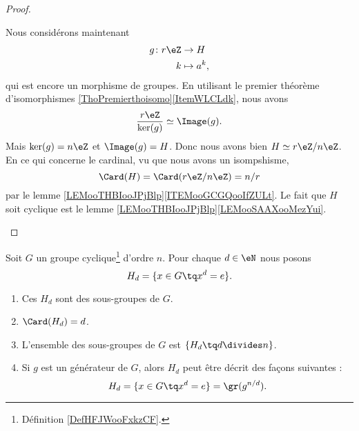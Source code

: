 \begin{proof}
\begin{subproof}
		Nous considérons maintenant
		\begin{equation}
			\begin{aligned}
				g\colon r\eZ & \to H        \\
				k            & \mapsto a^k,
			\end{aligned}
		\end{equation}
		qui est encore un morphisme de groupes. En utilisant le premier théorème d'isomorphismes \ref{ThoPremierthoisomo}\ref{ItemWLCLdk}, nous avons
		\begin{equation}
			\frac{ r\eZ }{ \ker(g) }\simeq\Image(g).
		\end{equation}
		Mais \( \ker(g)=n\eZ\) et \( \Image(g)=H\). Donc nous avons bien \( H\simeq r\eZ/n\eZ\).
		En ce qui concerne le cardinal, vu que nous avons un isompshisme,
		\begin{equation}
			\Card(H)=\Card(r\eZ/n\eZ)=n/r
		\end{equation}
		par le lemme \ref{LEMooTHBIooJPjBlp}\ref{ITEMooGCGQooIfZULt}.
		Le fait que \( H\) soit cyclique est le lemme \ref{LEMooTHBIooJPjBlp}\ref{LEMooSAAXooMezYui}.
	\end{subproof}
\end{proof}

\begin{theorem}     \label{THOooRGSTooIWyhqt}
	Soit \( G\) un groupe cyclique\footnote{Définition \ref{DefHFJWooFxkzCF}.} d'ordre \( n\). Pour chaque \( d\in \eN\) nous posons
	\begin{equation}
		H_d=\{ x\in G\tq x^d=e \}.
	\end{equation}
	\begin{enumerate}
		\item
		      Ces \( H_d\) sont des sous-groupes de \( G\).
		\item
		      \( \Card(H_d)=d\).
		\item       \label{ITEMooMJCXooCIWSmK}
		      L'ensemble des sous-groupes de \( G\) est \( \{ H_d\tq d\divides n \}\).
		\item     \label{ITEMooIEGUooPQWEep}
		      Si \( g\) est un générateur de \( G\), alors \( H_d\) peut être décrit des façons suivantes :
		      \begin{equation}
			      H_d=\{ x\in G\tq x^d=e \}=\gr(g^{n/d}).
		      \end{equation}
	\end{enumerate}
\end{theorem}

